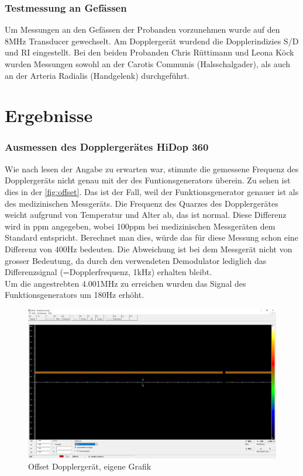 \documentclass[11pt]{scrartcl}
\begin{document}
    \subsubsection{Testmessung an Gefässen}
    Um Messungen an den Gefässen der Probanden vorzunehmen wurde auf den 8MHz Transducer gewechselt. 
    Am Dopplergerät wurdend die Dopplerindizies S/D und RI eingestellt.
    Bei den beiden Probanden Chris Rüttimann und Leona Köck wurden Messungen sowohl an der Carotis Communis
    (Halsschalgader), als auch an der Arteria Radialis (Handgelenk) durchgeführt.

    \section{Ergebnisse}
    \subsubsection{Ausmessen des Dopplergerätes HiDop 360}
    Wie nach lesen der Angabe zu erwarten war, stimmte die gemessene Frequenz des Dopplergeräts nicht genau mit der des Funtionsgenerators überein.
    Zu sehen ist dies in der \autoref{fig:offset}.
    Das ist der Fall, weil der Funktionsgenerator genauer ist als des medizinischen Messgeräts.
    Die Frequenz des Quarzes des Dopplergerätes weicht aufgrund von Temperatur und Alter ab, das ist normal.
    Diese Differenz wird in ppm angegeben, wobei 100ppm bei medizinischen Messgeräten dem Standard entspricht.
    Berechnet man dies, würde das für diese Messung schon eine Differenz von 400Hz bedeuten. 
    Die Abweichung ist bei dem Messgerät nicht von grosser Bedeutung, da durch den verwendeten Demodulator lediglich
    das Differenzsignal (=Dopplerfrequenz, 1kHz) erhalten bleibt.\\
    Um die angestrebten 4.001MHz zu erreichen wurden das Signal des Funktionsgenerators um 180Hz erhöht.

    \begin{figure}[H]
        \includegraphics[width=16cm]{images/4001MHz.png}
        \caption{Offset Dopplergerät, eigene Grafik}
        \label{fig:offset}
    \end{figure}
\end{document}
